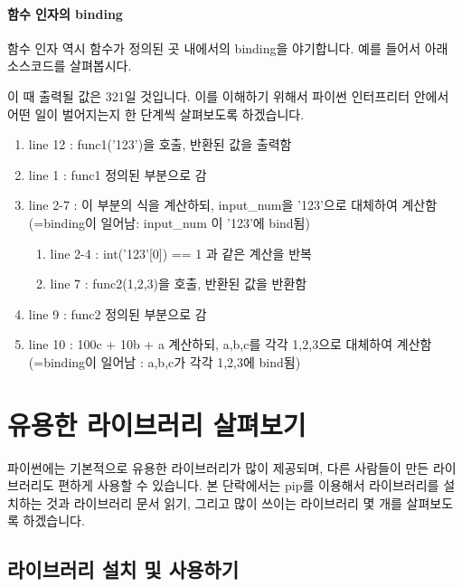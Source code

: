 \documentclass[twoside]{article}
\begin{document}
\paragraph{함수 인자의 binding} 

함수 인자 역시 함수가 정의된 곳 내에서의 binding을 야기합니다. 예를 들어서 아래 소스코드를 살펴봅시다. 


                
이 때 출력될 값은 321일 것입니다. 이를 이해하기 위해서 파이썬 인터프리터 안에서 어떤 일이 벌어지는지 한 단계씩 살펴보도록 하겠습니다. 

\begin{enumerate} 
\item line 12 : func1('123')을 호출, 반환된 값을 출력함
\item line 1 : func1 정의된 부분으로 감
\item line 2-7 : 이 부분의 식을 계산하되, input\_num을 '123'으로 대체하여 계산함 (=binding이 일어남: input\_num 이 '123'에 bind됨)
\begin{enumerate}
\item line 2-4 : int('123'[0]) == 1 과 같은 계산을 반복 
\item line 7 : func2(1,2,3)을 호출, 반환된 값을 반환함
\end{enumerate}
\item line 9 : func2 정의된 부분으로 감 
\item line 10 : 100c + 10b + a 계산하되, a,b,c를 각각 1,2,3으로 대체하여 계산함 (=binding이 일어남 : a,b,c가 각각 1,2,3에 bind됨)
\end{enumerate}

\section{유용한 라이브러리 살펴보기} 

파이썬에는 기본적으로 유용한 라이브러리가 많이 제공되며, 다른 사람들이 만든 라이브러리도 편하게 사용할 수 있습니다. 본 단락에서는 pip를 이용해서 라이브러리를 설치하는 것과 라이브러리 문서 읽기, 그리고 많이 쓰이는 라이브러리 몇 개를 살펴보도록 하겠습니다. 

\subsection{라이브러리 설치 및 사용하기} 
\end{document}
